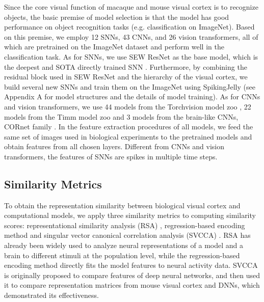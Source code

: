 \documentclass[letterpaper]{article} %
\begin{document}
Since the core visual function of macaque and mouse visual cortex is to recognize objects, the basic premise of model selection is that the model has good performance on object recognition tasks (e.g. classification on ImageNet). Based on this premise, we employ 12 SNNs, 43 CNNs, and 26 vision transformers, all of which are pretrained on the ImageNet dataset and perform well in the classification task. As for SNNs, we use SEW ResNet as the base model, which is the deepest and SOTA directly trained SNN \cite{fang2021deep}. Furthermore, by combining the residual block used in SEW ResNet and the hierarchy of the visual cortex, we build several new SNNs and train them on the ImageNet using SpikingJelly \cite{SpikingJelly} (see Appendix A for model structures and the details of model training). As for CNNs and vision transformers, we use 44 models from the Torchvision model zoo \cite{paszke2019pytorch}, 22 models from the Timm model zoo \cite{rw2019timm} and 3 models from the brain-like CNNs, CORnet family \cite{kubilius2019brain}. In the feature extraction procedures of all models, we feed the same set of images used in biological experiments to the pretrained models and obtain features from all chosen layers. Different from CNNs and vision transformers, the features of SNNs are spikes in multiple time steps.

\subsection{Similarity Metrics}
\label{methods.metric}

To obtain the representation similarity between biological visual cortex and computational models, we apply three similarity metrics to computing similarity scores: representational similarity analysis (RSA) \cite{kriegeskorte2008matching, kriegeskorte2008representational}, regression-based encoding method \cite{carandini2005we, yamins2014performance, schrimpf2020brain, schrimpf2020integrative} and singular vector canonical correlation analysis (SVCCA) \cite{raghu2017svcca, morcos2018insights}. RSA has already been widely used to analyze neural representations of a model and a brain to different stimuli at the population level, while the regression-based encoding method directly fits the model features to neural activity data. SVCCA is originally proposed to compare features of deep neural networks, and then \cite{shi2019comparison} used it to compare representation matrices from mouse visual cortex and DNNs, which demonstrated its effectiveness.
\end{document}
